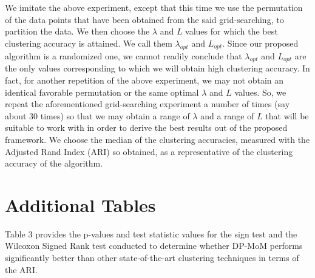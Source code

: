 \documentclass[12pt]{article}
\begin{document}
We imitate the above experiment, except that this time we use the permutation of the data points that have been obtained from the said grid-searching, to partition the data. We then choose the $\lambda$ and $L$ values for which the best clustering accuracy is attained. We call them $\lambda_{opt}$ and $L_{opt}$. Since our proposed algorithm is a randomized one, we cannot readily conclude that $\lambda_{opt}$ and $L_{opt}$ are the only values corresponding to which we will obtain high clustering accuracy. In fact, for another repetition of the above experiment, we may not obtain an identical favorable permutation or the same optimal $\lambda$ and $L$ values. So, we repeat the aforementioned grid-searching experiment a number of times (say about 30 times) so that we may obtain a range of $\lambda$ and a range of $L$ that will be suitable to work with in order to derive the best results out of the proposed framework. We choose the median of the clustering accuracies, measured with the Adjusted Rand Index (ARI) \cite{Hubert1985} so obtained, as a representative of the clustering accuracy of the algorithm.


\section{Additional Tables}

Table 3 provides the p-values and test statistic values for the sign test and the Wilcoxon Signed Rank test conducted to determine whether DP-MoM performs significantly better than other state-of-the-art clustering techniques in terms of the ARI.
\end{document}
